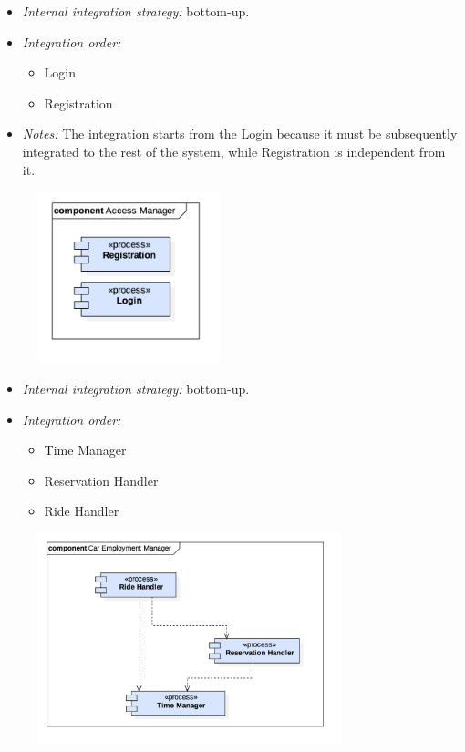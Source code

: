 			\begin{itemize}[label={},leftmargin=*,noitemsep,topsep=0pt]
				\item \textit{Internal integration strategy:} bottom-up.
				\item \textit{Integration order:}
					\begin{itemize}[noitemsep]
						\item Login
						\item Registration
					\end{itemize}
				\item \textit{Notes: } The integration starts from the Login because it must be subsequently integrated to the rest of the system, while Registration is independent from it.
			\end{itemize}
			\begin{figure}[h]
				\includegraphics[width=150pt, center]{img/integration_strategy/subcomponents/access_manager.png}
			\end{figure}
		\FloatBarrier

			\begin{itemize}[label={},leftmargin=*,noitemsep,topsep=0pt]
				\item \textit{Internal integration strategy:} bottom-up.
				\item \textit{Integration order:}
				\begin{itemize}[noitemsep]
					\item Time Manager
					\item Reservation Handler
					\item Ride Handler
				\end{itemize}
			\end{itemize}
			\begin{figure}[h]
				\includegraphics[width=250pt, center]{img/integration_strategy/subcomponents/car_employment_manager.png}
			\end{figure}
		\FloatBarrier

